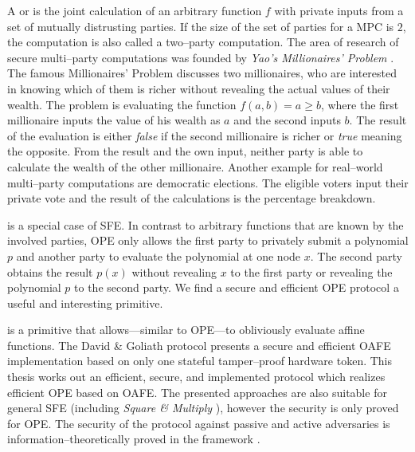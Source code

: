 \label{sec:introduction}

A  or  is the joint calculation of an arbitrary function $f$ with
private inputs from a set of mutually distrusting parties. If the size of the
set of parties for a MPC is $2$, the computation is also called a two--party
computation. The area of research of secure multi--party computations was
founded by \emph{Yao's Millionaires' Problem} \cite{yao82}. The famous
Millionaires' Problem discusses two millionaires, who are interested in knowing
which of them is richer without revealing the actual values of their wealth. The
problem is evaluating the function $f(a, b) = a \geq b$, where the first
millionaire inputs the value of his wealth as $a$ and the second inputs $b$. The
result of the evaluation is either \textit{false} if the second millionaire is
richer or \textit{true} meaning the opposite. From the result and the own input,
neither party is able to calculate the wealth of the other millionaire. Another
example for real--world multi--party computations are democratic elections. The
eligible voters input their private vote and the result of the calculations is
the percentage breakdown.

 \cite{naor99,naor06} is a special
case of SFE. In contrast to arbitrary functions that are known by the involved
parties, OPE only allows the first party to privately submit a polynomial $p$
and another party to evaluate the polynomial at one node $x$. The second party
obtains the result $p(x)$ without revealing $x$ to the first party or revealing
the polynomial $p$ to the second party. We find a secure and efficient OPE
protocol a useful and interesting primitive. 

 \cite{davidgoliath} is a
primitive that allows---similar to OPE---to obliviously evaluate affine
functions. The David \& Goliath protocol \cite{davidgoliath} presents a secure
and efficient OAFE implementation based on only one stateful tamper--proof
hardware token. This thesis works out an efficient, secure, and implemented
protocol which realizes efficient OPE based on OAFE. The presented approaches
are also suitable for general SFE (including \emph{Square \& Multiply}
\cite{knuth81}), however the security is only proved for OPE. The security of
the protocol against passive and active adversaries is
in\-for\-ma\-tion--the\-o\-ret\-ically proved in the  framework \cite{canetti05}. 


